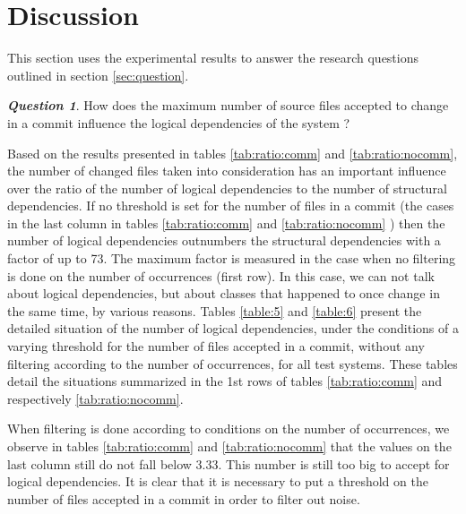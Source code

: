 \documentclass[a4paper,twoside]{article}
\begin{document}
\section{Discussion}
\label{sec:discussion}


This section uses the experimental results to answer the research questions outlined in section \ref{sec:question}.

\textit{\textbf{Question 1}}. How does the maximum number of source files accepted to change in a commit influence the logical dependencies of the system ?

Based on the results presented in tables \ref{tab:ratio:comm} and \ref{tab:ratio:nocomm}, the number 
of changed files taken into consideration has an important influence over the ratio of the number  of 
logical dependencies to the number of structural dependencies.  If no threshold is set for the number of files in a commit (the cases in the last column in tables \ref{tab:ratio:comm} and 
\ref{tab:ratio:nocomm} ) then the number of logical dependencies outnumbers the structural dependencies with a factor of up to 73. The maximum factor is measured in the case when no filtering is done on the number of occurrences (first row).  
In this case, we can not talk about logical dependencies, but about classes that happened to once change in the same time, by various reasons. Tables \ref{table:5} and \ref{table:6}  present the detailed situation of the number of logical dependencies, under the conditions of a varying threshold for the number of files accepted in a commit, without any filtering according to the number of occurrences, for all test systems. These tables detail the situations summarized in the 1st rows of tables \ref{tab:ratio:comm} and respectively \ref{tab:ratio:nocomm}. 

When filtering is done according to conditions on the number of occurrences, we observe in tables \ref{tab:ratio:comm} and \ref{tab:ratio:nocomm} that the values on the last column still do not fall below 3.33. This number is still too big to accept for logical dependencies.  It is clear that it is necessary to  put a threshold on the number of files accepted in a commit in order to filter out noise.
\end{document}
